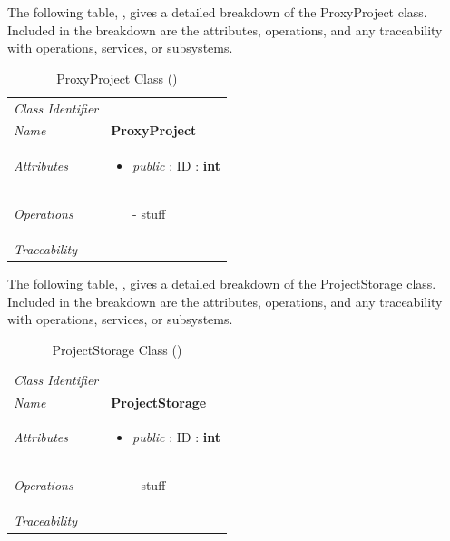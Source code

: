 \documentclass[12pt,letterpaper]{article}
\begin{document}
The following table, , gives a detailed breakdown of the ProxyProject class. Included in the breakdown are the attributes, operations, and any traceability with operations, services, or subsystems.

\begin{table}[H]
    \caption{ProxyProject Class ()} 
	\begin{tabu} to 
		\toprule
		Class Identifier &  \\
		Name & {\bf ProxyProject} \\
		Attributes & 
		\begin{minipage}[t]{\linewidth}
		    \begin{itemize}
		        \item \textit{public} : ID : \bf{int}
			\end{itemize}
	    \end{minipage} \\

		Operations &
		\begin{minipage}[t]{\linewidth}
			\begin{enumerate}
			    \item[-] stuff
	        \end{enumerate}
	    \end{minipage} \\
	    	Traceability & \\
		\toprule
	\end{tabu}
\end{table}

The following table, , gives a detailed breakdown of the ProjectStorage class. Included in the breakdown are the attributes, operations, and any traceability with operations, services, or subsystems.

\begin{table}[H]
    \caption{ProjectStorage Class ()} 
	\begin{tabu} to 
		\toprule
		Class Identifier &  \\
		Name & {\bf ProjectStorage} \\
		Attributes & 
		\begin{minipage}[t]{\linewidth}
		    \begin{itemize}
		        \item \textit{public} : ID : \bf{int}
			\end{itemize}
	    \end{minipage} \\

		Operations &
		\begin{minipage}[t]{\linewidth}
			\begin{enumerate}
			    \item[-] stuff
	        \end{enumerate}
	    \end{minipage} \\
	    	Traceability & \\
		\toprule
	\end{tabu}
\end{table}
\end{document}
